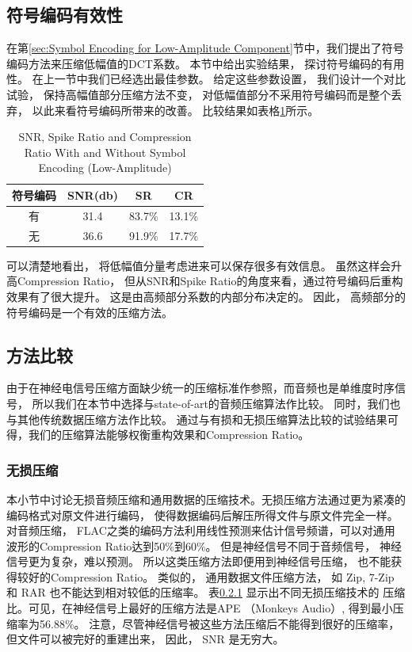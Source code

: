 \subsection{符号编码有效性}
在第\ref{sec:Symbol Encoding for Low-Amplitude Component}节中，我们提出了符号编码方法来压缩低幅值的DCT系数。 本节中给出实验结果， 探讨符号编码的有用性。 在上一节中我们已经选出最佳参数。 给定这些参数设置， 我们设计一个对比试验， 保持高幅值部分压缩方法不变， 对低幅值部分不采用符号编码而是整个丢弃， 以此来看符号编码所带来的改善。 比较结果如表格\ref{tab:T1}所示。\\


\begin{table}[ht]
\centering
  \begin{tabular}{c c c c}
  \hline\hline
  符号编码 & SNR(db) & SR & CR \\ [0.5ex] %
  \hline
  有 & 31.4 & 83.7\% & 13.1\% \\
  无 & 36.6 & 91.9\% & 17.7\% \\
  \hline
  \end{tabular}
  \caption{SNR, Spike Ratio and Compression Ratio With and Without Symbol Encoding (Low-Amplitude)}
  \centering \label{tab:T1}
\end{table}


可以清楚地看出， 将低幅值分量考虑进来可以保存很多有效信息。 虽然这样会升高Compression Ratio， 但从SNR和Spike Ratio的角度来看，通过符号编码后重构效果有了很大提升。 这是由高频部分系数的内部分布决定的。 因此， 高频部分的符号编码是一个有效的压缩方法。



\subsection{方法比较}
由于在神经电信号压缩方面缺少统一的压缩标准作参照，而音频也是单维度时序信号， 所以我们在本节中选择与state-of-art的音频压缩算法作比较。 同时，我们也与其他传统数据压缩方法作比较。 通过与有损和无损压缩算法比较的试验结果可得，我们的压缩算法能够权衡重构效果和Compression Ratio。


\subsubsection{无损压缩}
本小节中讨论无损音频压缩和通用数据的压缩技术。无损压缩方法通过更为紧凑的编码格式对原文件进行编码， 使得数据编码后解压所得文件与原文件完全一样。 对音频压缩， FLAC之类的编码方法利用线性预测来估计信号频谱，可以对通用波形的Compression Ratio达到50\%到60\%\cite{23}。 但是神经信号不同于音频信号， 神经信号更为复杂，难以预测。 所以这类压缩方法即便用到神经信号压缩， 也不能获得较好的Compression Ratio。 类似的， 通用数据文件压缩方法， 如 Zip, 7-Zip 和 RAR 也不能达到相对较低的压缩率。 表\ref{} 显示出不同无损压缩技术的
压缩比。可见，在神经信号上最好的压缩方法是APE （Monkeys Audio）, 得到最小压缩率为56.88\%。 注意，尽管神经信号被这些方法压缩后不能得到很好的压缩率， 但文件可以被完好的重建出来， 因此， SNR 是无穷大。 



